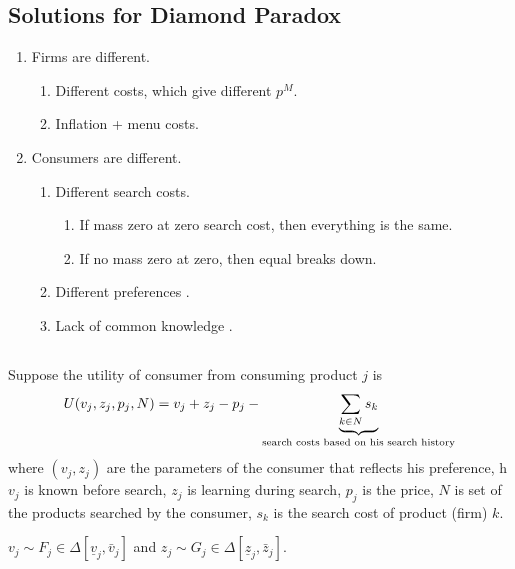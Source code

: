 \documentclass[11pt]{elegantbook}
\begin{document}
\subsection{Solutions for Diamond Paradox}
\begin{enumerate}
    \item Firms are different.
    \begin{enumerate}
        \item Different costs, which give different $p^M$.
        \item Inflation + menu costs.
    \end{enumerate}
    \item Consumers are different.
    \begin{enumerate}
        \item Different search costs.
        \begin{enumerate}
            \item If mass zero at zero search cost, then everything is the same.
            \item If no mass zero at zero, then equal breaks down.
        \end{enumerate}
        \item Different preferences \cite{choi2018consumer}.
        \item Lack of common knowledge \cite{kuksov2006search}.
    \end{enumerate}
\end{enumerate}

\subsection{\cite{choi2018consumer}}
Suppose the utility of consumer from consuming product $j$ is
\begin{equation}
    \begin{aligned}
        U(v_j,z_j,p_j,N)=v_j+z_j-p_j-\underbrace{\sum_{k\in N}s_k}_\textnormal{search costs based on his search history}
    \end{aligned}
    \nonumber
\end{equation}
where $(v_j,z_j)$ are the parameters of the consumer that reflects his preference, h $v_j$ is known before search, $z_j$ is learning during search, $p_j$ is the price, $N$ is set of the products searched by the consumer, $s_k$ is the search cost of product (firm) $k$.

\begin{assumption}
    $v_j\sim F_j\in \Delta[\underline{v}_j,\bar{v}_j]$ and $z_j\sim G_j\in \Delta[\underline{z}_j,\bar{z}_j]$.
\end{assumption}
\end{document}
